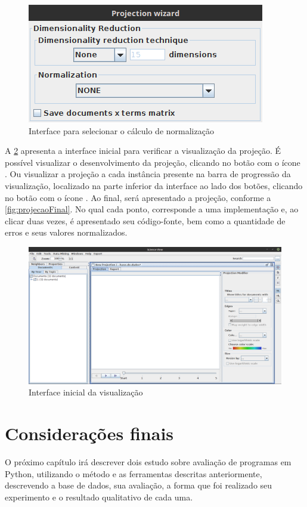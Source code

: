 		\begin{figure}
			\centering
			\includegraphics[width=0.8\linewidth]{imagem/normalizacao}
			\caption{Interface para selecionar o cálculo de normalização}
			\label{fig:normalizacao}
		\end{figure}
		
		A \cref{fig:projecao} apresenta a interface inicial para verificar a visualização da
		projeção. É possível visualizar o desenvolvimento da projeção, clicando no botão
		com o ícone . Ou visualizar a projeção a cada instância presente na
		barra de progressão da visualização, localizado na parte inferior da interface ao
		lado dos botões, clicando no botão com o ícone . Ao final, será
		apresentado a projeção, conforme a \cref{fig:projecaoFinal}. No qual cada ponto,
		corresponde a uma implementação e, ao clicar duas vezes, é apresentado seu
		código-fonte, bem como a quantidade de erros e seus valores normalizados.
		
		\begin{figure}
			\centering
			\includegraphics[width=0.8\linewidth]{imagem/projecao}
			\caption{Interface inicial da visualização}
			\label{fig:projecao}
		\end{figure}

	\section{Considerações finais}
	
		O próximo capítulo %
		irá descrever dois estudo sobre avaliação de programas em Python,
		utilizando o método e as ferramentas descritas anteriormente,
		descrevendo a base de dados, sua avaliação, a forma que foi realizado
		seu experimento e o resultado qualitativo de cada uma.
